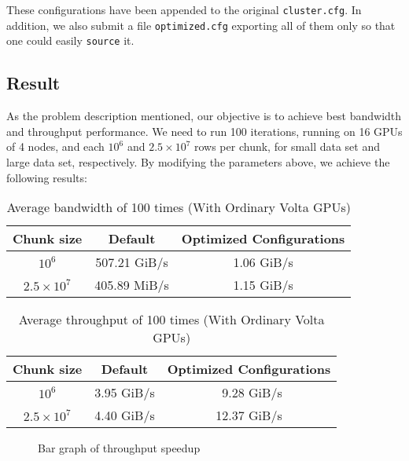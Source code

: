 \documentclass{article}
\begin{document}
These configurations have been appended to the original \texttt{cluster.cfg}. In addition, we also submit a file \texttt{optimized.cfg} \texttt{}{export}ing all of them only so that one could easily \texttt{source} it.

\subsection{Result}

As the problem description mentioned, our objective is to achieve best bandwidth and throughput performance. We need to run 100 iterations, running on 16 GPUs of 4 nodes, and each $10^6$ and $2.5\times10^7$ rows per chunk, for small data set and large data set, respectively. By modifying the parameters above, we achieve the following results:

\begin{table}[h!]
    \centering
    \caption{Average bandwidth of 100 times (With Ordinary Volta GPUs)}
    \begin{tabular}{c|c|c}
      \textbf{Chunk size} & \textbf{Default} & \textbf{Optimized Configurations}\\
      \hline
      $10^6$ & 507.21 GiB/s & 1.06 GiB/s\\
      $2.5\times10^7$ & 405.89 MiB/s & 1.15 GiB/s\\
    \end{tabular}
    \label{tab:volta_bw}
\end{table}

\pagebreak

\begin{table}[h!]
    \centering
    \caption{Average throughput of 100 times (With Ordinary Volta GPUs)}
    \begin{tabular}{c|c|c}
      \textbf{Chunk size} & \textbf{Default} & \textbf{Optimized Configurations}\\
      \hline
      $10^6$ & 3.95 GiB/s & \ 9.28 GiB/s\\
      $2.5\times10^7$ & 4.40 GiB/s & 12.37 GiB/s\\
    \end{tabular}
    \label{tab:volta}
\end{table}

\begin{figure}[htbp]
    \centering
    \caption{Bar graph of throughput speedup}
    \label{fig:bar}
\end{figure}
\end{document}

